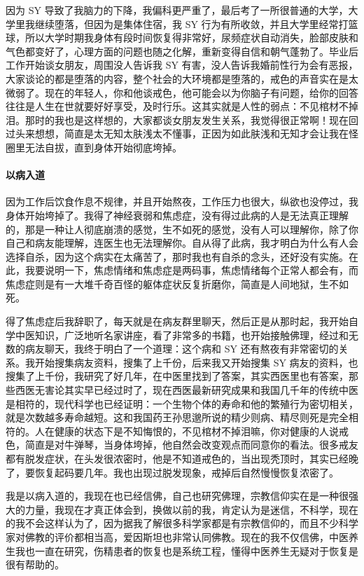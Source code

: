 \documentclass{ctexart}
\begin{document}
因为 SY 导致了我脑力的下降，我偏科更严重了，最后考了一所很普通的大学，大学里我继续堕落，但因为是集体住宿，我 SY 行为有所收敛，并且大学里经常打篮球，所以大学时期我身体有段时间恢复得非常好，尿频症状自动消失，脸部皮肤和气色都变好了，心理方面的问题也随之化解，重新变得自信和朝气蓬勃了。毕业后工作开始谈女朋友，周围没人告诉我 SY 有害，没人告诉我婚前性行为会有恶报，大家谈论的都是堕落的内容，整个社会的大环境都是堕落的，戒色的声音实在是太微弱了。现在的年轻人，你和他谈戒色，他可能会以为你脑子有问题，给你的回答往往是人生在世就要好好享受，及时行乐。这其实就是人性的弱点：不见棺材不掉泪。那时的我也是这样想的，大家都谈女朋友发生关系，我觉得很正常啊！现在回过头来想想，简直是太无知太肤浅太不懂事，正因为如此肤浅和无知才会让我在怪圈里无法自拔，直到身体开始彻底垮掉。

\paragraph{以病入道}

因为工作后饮食作息不规律，并且开始熬夜，工作压力也很大，纵欲也没停过，我身体开始垮掉了。我得了神经衰弱和焦虑症，没有得过此病的人是无法真正理解的，那是一种让人彻底崩溃的感觉，生不如死的感觉，没有人可以理解你，除了你自己和病友能理解，连医生也无法理解你。自从得了此病，我才明白为什么有人会选择自杀，因为这个病实在太痛苦了，那时我也有自杀的念头，还好没有实施。在此，我要说明一下，焦虑情绪和焦虑症是两码事，焦虑情绪每个正常人都会有，而焦虑症则是有一大堆千奇百怪的躯体症状反复折磨你，简直是人间地狱，生不如死。

得了焦虑症后我辞职了，每天就是在病友群里聊天，然后正是从那时起，我开始自学中医知识，广泛地听名家讲座，看了非常多的书籍，也开始接触佛理，经过和无数的病友聊天，我终于明白了一个道理：这个病和 SY 还有熬夜有非常密切的关系。我开始搜集病友资料，搜集了上千份，后来我又开始搜集 SY 病友的资料，也搜集了上千份，我研究了好几年，在中医里找到了答案，其实西医里也有答案，那些西医无害论其实早已经过时了，现在西医最新研究成果和我国几千年的传统中医是相符的，现代科学也已经证明：一个生物个体的寿命和他的繁殖行为密切相关，就是次数越多寿命越短。这和我国药王孙思邈所说的精少则病、精尽则死是完全相符的。人在健康的状态下是不知悔恨的，不见棺材不掉泪嘛，你对健康的人说戒色，简直是对牛弹琴，当身体垮掉，他自然会改变观点而同意你的看法。很多戒友都有脱发症状，在头发很浓密时，他是不知道戒色的，当出现秃顶时，其实已经晚了，要恢复起码要几年。我也出现过脱发现象，戒掉后自然慢慢恢复浓密了。

我是以病入道的，我现在也已经信佛，自己也研究佛理，宗教信仰实在是一种很强大的力量，我现在才真正体会到，换做以前的我，肯定认为是迷信，不科学，现在的我不会这样认为了，因为据我了解很多科学家都是有宗教信仰的，而且不少科学家对佛教的评价都相当高，爱因斯坦也非常认同佛教。现在的我不仅信佛，中医养生我也一直在研究，伤精患者的恢复也是系统工程，懂得中医养生无疑对于恢复是很有帮助的。
\end{document}
